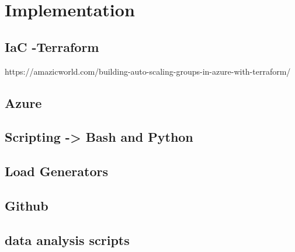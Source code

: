 \chapter{Implementation}

\section{IaC -Terraform}
https://amazicworld.com/building-auto-scaling-groups-in-azure-with-terraform/
\section{Azure}

\section{Scripting -> Bash and Python}

\section{Load Generators}

\section{Github}

\section{data analysis scripts}
















